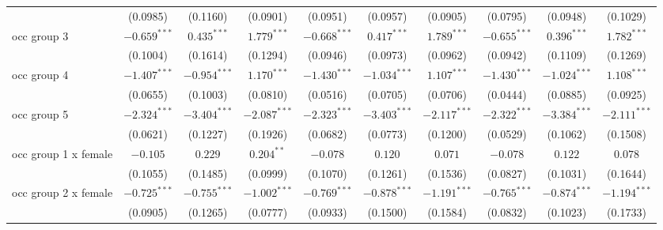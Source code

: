 \begin{tabular}{l|ccc|ccc|ccc}
                           &                (0.0985) &        (0.1160) &        (0.0901) &                 (0.0951) &        (0.0957) &        (0.0905) &                 (0.0795) &        (0.0948) &        (0.1029) \\
occ group 3                &          $-0.659^{***}$ &   $0.435^{***}$ &   $1.779^{***}$ &           $-0.668^{***}$ &   $0.417^{***}$ &   $1.789^{***}$ &           $-0.655^{***}$ &   $0.396^{***}$ &   $1.782^{***}$ \\
                           &                (0.1004) &        (0.1614) &        (0.1294) &                 (0.0946) &        (0.0973) &        (0.0962) &                 (0.0942) &        (0.1109) &        (0.1269) \\
occ group 4                &          $-1.407^{***}$ &  $-0.954^{***}$ &   $1.170^{***}$ &           $-1.430^{***}$ &  $-1.034^{***}$ &   $1.107^{***}$ &           $-1.430^{***}$ &  $-1.024^{***}$ &   $1.108^{***}$ \\
                           &                (0.0655) &        (0.1003) &        (0.0810) &                 (0.0516) &        (0.0705) &        (0.0706) &                 (0.0444) &        (0.0885) &        (0.0925) \\
occ group 5                &          $-2.324^{***}$ &  $-3.404^{***}$ &  $-2.087^{***}$ &           $-2.323^{***}$ &  $-3.403^{***}$ &  $-2.117^{***}$ &           $-2.322^{***}$ &  $-3.384^{***}$ &  $-2.111^{***}$ \\
                           &                (0.0621) &        (0.1227) &        (0.1926) &                 (0.0682) &        (0.0773) &        (0.1200) &                 (0.0529) &        (0.1062) &        (0.1508) \\
occ group 1 x female       &                $-0.105$ &         $0.229$ &    $0.204^{**}$ &                 $-0.078$ &         $0.120$ &         $0.071$ &                 $-0.078$ &         $0.122$ &         $0.078$ \\
                           &                (0.1055) &        (0.1485) &        (0.0999) &                 (0.1070) &        (0.1261) &        (0.1536) &                 (0.0827) &        (0.1031) &        (0.1644) \\
occ group 2 x female       &          $-0.725^{***}$ &  $-0.755^{***}$ &  $-1.002^{***}$ &           $-0.769^{***}$ &  $-0.878^{***}$ &  $-1.191^{***}$ &           $-0.765^{***}$ &  $-0.874^{***}$ &  $-1.194^{***}$ \\
                           &                (0.0905) &        (0.1265) &        (0.0777) &                 (0.0933) &        (0.1500) &        (0.1584) &                 (0.0832) &        (0.1023) &        (0.1733) \\

\end{tabular}
